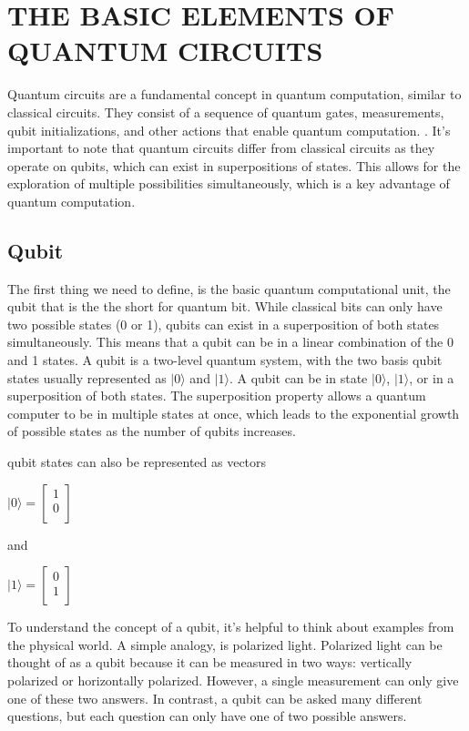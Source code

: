 \documentclass[inscr,ack,preface]{diphdthesis}
\begin{document}
\chapter{THE BASIC ELEMENTS OF QUANTUM CIRCUITS}

Quantum circuits are a fundamental concept in quantum computation, similar to classical circuits. They consist of a sequence of quantum gates, measurements, \acrshort{qubit} initializations, and other actions that enable quantum computation. \cite{niel}. It's important to note that quantum circuits differ from classical circuits as they operate on \acrshort{qubit}s, which can exist in superpositions of states. This allows for the exploration of multiple possibilities simultaneously, which is a key advantage of quantum computation. 

\section{Qubit}

The first thing we need to define, is the basic quantum computational unit, the \acrshort{qubit} that is the the short for quantum bit. 
 While classical bits can only have two possible states (0 or 1), \acrshort{qubit}s can exist in a superposition of both states simultaneously. This means that a \acrshort{qubit} can be in a linear combination of the 0 and 1 states. A \acrshort{qubit} is a two-level quantum system, with the two basis \acrshort{qubit} states usually represented as $\vert0\rangle$ and $\vert1\rangle$. A \acrshort{qubit} can be in state $\vert0\rangle$, $\vert1\rangle$, or in a superposition of both states. The superposition property allows a quantum computer to be in multiple states at once, which leads to the exponential growth of possible states as the number of \acrshort{qubit}s increases.\cite{qubit}
 
 \acrshort{qubit} states can also be represented as vectors
 \begin{center}
 \Large
 $\vert0\rangle = 
    \begin{bmatrix}
    1 \\
    0 \\
    \end{bmatrix}$
\end{center}
\normalsize
and \\
\begin{center}
\Large
$\vert1\rangle = 
\begin{bmatrix}
0 \\
1 \\
\end{bmatrix}$
\end{center}
\normalsize
To understand the concept of a \acrshort{qubit}, it's helpful to think about examples from the physical world. A simple analogy, is polarized light. Polarized light can be thought of as a \acrshort{qubit} because it can be measured in two ways: vertically polarized or horizontally polarized. However, a single measurement can only give one of these two answers. In contrast, a \acrshort{qubit} can be asked many different questions, but each question can only have one of two possible answers\cite{polarized}.
\end{document}

